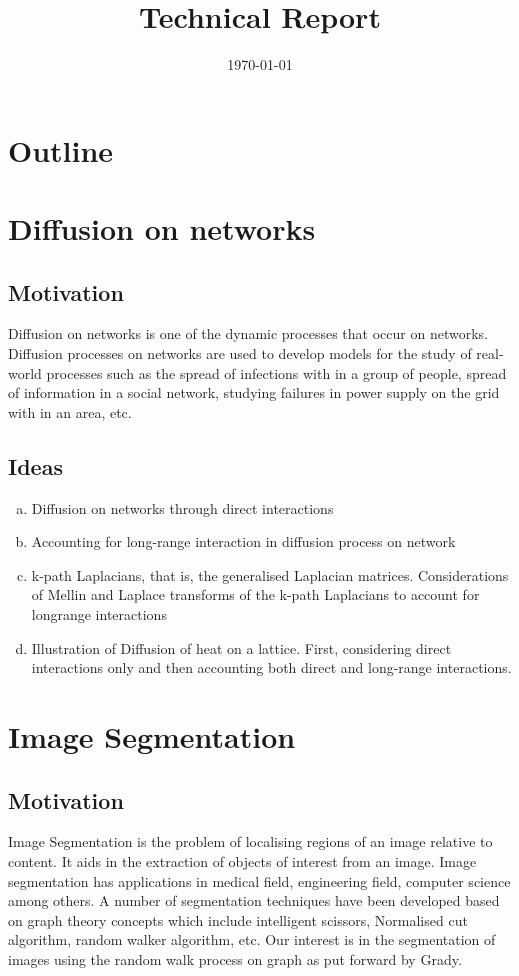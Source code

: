 \documentclass[10pt,a4paper]{article}
\title{Technical Report}
\date{\today}
\begin{document}
	\maketitle
	
	\vspace{1cm}
	\section*{Outline}
	\section{Diffusion on networks}
	\subsection{Motivation}
	Diffusion on networks is one of the dynamic processes that occur on networks. Diffusion processes on networks are used to develop models for the study of real-world processes such as the spread of infections with in a group of people, spread of information in a social network, studying failures in power supply on the grid with in an area, etc.
	\subsection{Ideas}
	\begin{enumerate}[a)]
		\item  Diffusion on networks through direct interactions
		\item  Accounting for long-range interaction in diffusion process on network
		\item k-path Laplacians, that is, the generalised Laplacian matrices. Considerations of Mellin and Laplace transforms of the k-path Laplacians to account for longrange interactions
		\item Illustration of Diffusion of heat on a lattice. First, considering direct interactions only and then accounting both direct and long-range interactions. 
	\end{enumerate}
    \section{Image Segmentation}
    \subsection{Motivation}
    Image Segmentation is the problem of localising regions of an image relative to content. It aids in the extraction of objects of interest from an image. Image segmentation has applications in medical field, engineering field, computer science among others. A number of segmentation techniques have been developed based on graph theory concepts which include intelligent scissors, Normalised cut algorithm, random walker algorithm, etc. Our interest is in the segmentation of images using the random walk process on graph as put forward by Grady.
\end{document}
